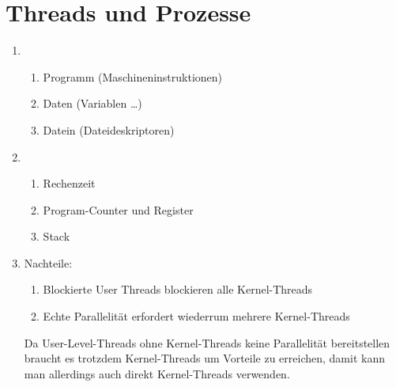 \documentclass[DIN, pagenumber=false, fontsize=11pt, parskip=half]{scrartcl}
\begin{document}
    \section{Threads und Prozesse}
            \begin{enumerate}[label=(\alph*)]
                \item 
                    \begin{enumerate}
                        \item Programm (Maschineninstruktionen)
                        \item Daten (Variablen \ldots)
                        \item Datein (Dateideskriptoren)
                    \end{enumerate}
                \item
                    \begin{enumerate}
                        \item Rechenzeit
                        \item Program-Counter und Register
                        \item Stack
                    \end{enumerate}
                \item Nachteile:
                    \begin{enumerate}
                        \item Blockierte User Threads blockieren alle Kernel-Threads
                        \item Echte Parallelität erfordert wiederrum mehrere Kernel-Threads
                    \end{enumerate}
                    Da User-Level-Threads ohne Kernel-Threads keine Parallelität bereitstellen braucht es trotzdem Kernel-Threads um Vorteile zu erreichen, damit kann man allerdings auch direkt Kernel-Threads verwenden.
            \end{enumerate}
\end{document}
